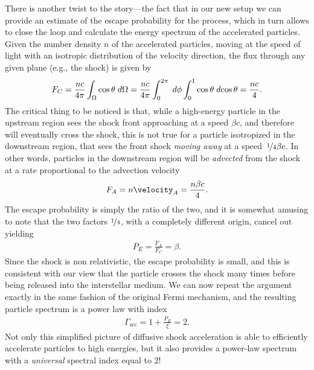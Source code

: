 There is another twist to the story---the fact that in our new setup we can provide
an estimate of the escape probability for the process, which in turn allows to close
the loop and calculate the energy spectrum of the accelerated particles.
Given the number density $n$ of the accelerated particles, moving at the speed of
light with an isotropic distribution of the velocity direction, the flux through
any given plane (e.g., the shock) is given by
\begin{align*}
  F_C = \frac{nc}{4\pi}\int_\Omega \cos\theta \;d{\Omega} =
  \frac{nc}{4\pi}\int_0^{2\pi}\;d{\phi}\int_0^{1} \cos\theta \;d{\cos\theta} =
  \frac{nc}{4}.
\end{align*}
The critical thing to be noticed is that, while a high-energy particle in the
upstream region sees the shock front approaching at a speed $\beta c$, and therefore
will eventually cross the shock, this is not true for a particle isotropized in
the downstream region, that sees the front shock \emph{moving away} at a
speed~$\nicefrac{1}{4} \beta c$. In other words, particles in the downstream region
will be \emph{advected} from the shock at a rate proportional to the advection
velocity
\begin{align*}
  F_A = n\velocity_A = \frac{n\beta c}{4}.
\end{align*}
The escape probability is simply the ratio of the two, and it is somewhat amusing
to note that the two factors $\nicefrac{1}{4}$, with a completely different origin,
cancel out yielding
\begin{align}
  P_E = \frac{F_A}{F_C} = \beta.
\end{align}
Since the shock is non relativistic, the escape probability is small, and this
is consistent with our view that the particle crosses the shock many times before
being released into the interstellar medium. We can now repeat the argument
exactly in the same fashion of the original Fermi mechanism, and the resulting
particle spectrum is a power law with index
\begin{align}
  \Gamma_\text{src} = 1 + \frac{P_E}{\xi} = 2.
\end{align}
Not only this simplified picture of diffusive shock acceleration is able to efficiently
accelerate particles to high energies, but it also provides a power-law spectrum
with a \emph{universal} spectral index equal to $2$!

